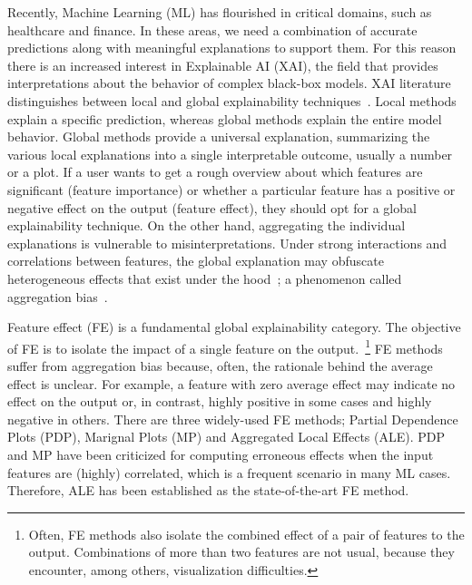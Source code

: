 \documentclass[twoside]{article}
\begin{document}
Recently, Machine Learning (ML) has flourished in critical domains,
such as healthcare and finance. In these areas, we need a combination
of accurate predictions along with meaningful explanations to support
them. For this reason there is an increased interest in Explainable AI
(XAI), the field that provides interpretations about the behavior of
complex black-box models. XAI literature distinguishes between local
and global explainability
techniques~\citep{Molnar2020interpretable}. Local methods explain a
specific prediction, whereas global methods explain the entire model
behavior. Global methods provide a universal explanation, summarizing
the various local explanations into a single interpretable outcome,
usually a number or a plot. If a user wants to get a rough overview
about which features are significant (feature importance) or whether a
particular feature has a positive or negative effect on the output
(feature effect), they should opt for a global explainability
technique. On the other hand, aggregating the individual explanations
is vulnerable to misinterpretations. Under strong interactions and
correlations between features, the global explanation may obfuscate
heterogeneous effects that exist under the
hood~\citep{herbinger2022repid}; a phenomenon called aggregation
bias~\citep{mehrabi2021survey}.

Feature effect (FE) \citep{Gromping2020MAEP} is a fundamental global
explainability category. The objective of FE is to isolate the impact
of a single feature on the output.~\footnote{Often, FE methods also
  isolate the combined effect of a pair of features to the
  output. Combinations of more than two features are not usual,
  because they encounter, among others, visualization difficulties.}
FE methods suffer from aggregation bias because, often, the rationale
behind the average effect is unclear. For example, a feature with zero
average effect may indicate no effect on the output or, in contrast,
highly positive in some cases and highly negative in others. There are
three widely-used FE methods; Partial Dependence Plots
(PDP)\citep{friedman2001greedy}, Marignal Plots
(MP)\citep{apley2020visualizing} and Aggregated Local Effects
(ALE)\citep{apley2020visualizing}. PDP and MP have been criticized for
computing erroneous effects when the input features are (highly)
correlated, which is a frequent scenario in many ML cases. Therefore,
ALE has been established as the state-of-the-art FE method.
\end{document}
